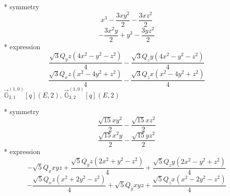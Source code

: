 \documentclass[fleqn,8pt]{jsarticle}
\begin{document}
\noindent\quad ** symmetry
\begin{dmath*}
x^{3} - \frac{3 x y^{2}}{2} - \frac{3 x z^{2}}{2}
\end{dmath*}
\begin{dmath*}
- \frac{3 x^{2} y}{2} + y^{3} - \frac{3 y z^{2}}{2}
\end{dmath*}
\noindent\quad ** expression
\begin{dmath*}
\frac{\sqrt{3} Q_{y} z \left(4 x^{2} - y^{2} - z^{2}\right)}{4} - \frac{\sqrt{3} Q_{z} y \left(4 x^{2} - y^{2} - z^{2}\right)}{4}
\end{dmath*}
\begin{dmath*}
\frac{\sqrt{3} Q_{x} z \left(x^{2} - 4 y^{2} + z^{2}\right)}{4} - \frac{\sqrt{3} Q_{z} x \left(x^{2} - 4 y^{2} + z^{2}\right)}{4}
\end{dmath*}
\noindent\quad $\vec{\mathbb{G}}_{3,1}^{(1,0)}[q](E,2)$, $\vec{\mathbb{G}}_{3,2}^{(1,0)}[q](E,2)$

\noindent\quad ** symmetry
\begin{dmath*}
\frac{\sqrt{15} x y^{2}}{2} - \frac{\sqrt{15} x z^{2}}{2}
\end{dmath*}
\begin{dmath*}
\frac{\sqrt{15} x^{2} y}{2} - \frac{\sqrt{15} y z^{2}}{2}
\end{dmath*}
\noindent\quad ** expression
\begin{dmath*}
- \sqrt{5} Q_{x} x y z + \frac{\sqrt{5} Q_{y} z \left(2 x^{2} + y^{2} - z^{2}\right)}{4} + \frac{\sqrt{5} Q_{z} y \left(2 x^{2} - y^{2} + z^{2}\right)}{4}
\end{dmath*}
\begin{dmath*}
- \frac{\sqrt{5} Q_{x} z \left(x^{2} + 2 y^{2} - z^{2}\right)}{4} + \sqrt{5} Q_{y} x y z + \frac{\sqrt{5} Q_{z} x \left(x^{2} - 2 y^{2} - z^{2}\right)}{4}
\end{dmath*}
\end{document}
